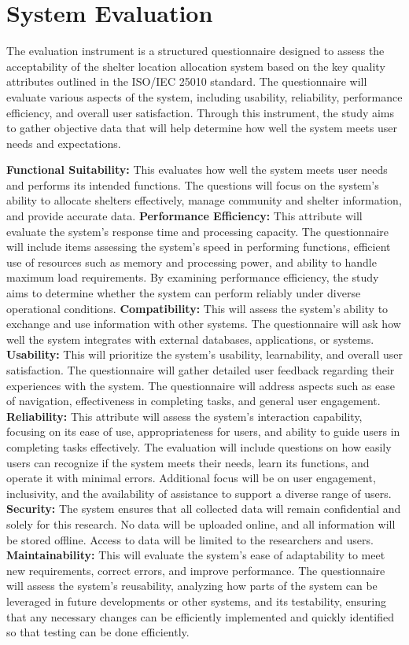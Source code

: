\section{System Evaluation}

The evaluation instrument is a structured questionnaire designed to assess the acceptability of the shelter location allocation system based on the key quality attributes outlined in the ISO/IEC 25010 standard. The questionnaire will evaluate various aspects of the system, including usability, reliability, performance efficiency, and overall user satisfaction. Through this instrument, the study aims to gather objective data that will help determine how well the system meets user needs and expectations.

\textbf{Functional Suitability:} This evaluates how well the system meets user needs and performs its intended functions. The questions will focus on the system's ability to allocate shelters effectively, manage community and shelter information, and provide accurate data.
\textbf{Performance Efficiency:} This attribute will evaluate the system's response time and processing capacity. The questionnaire will include items assessing the system's speed in performing functions, efficient use of resources such as memory and processing power, and ability to handle maximum load requirements. By examining performance efficiency, the study aims to determine whether the system can perform reliably under diverse operational conditions.
\textbf{Compatibility:} This will assess the system’s ability to exchange and use information with other systems. The questionnaire will ask how well the system integrates with external databases, applications, or systems. 
\textbf{Usability:} This will prioritize the system's usability, learnability, and overall user satisfaction. The questionnaire will gather detailed user feedback regarding their experiences with the system. The questionnaire will address aspects such as ease of navigation, effectiveness in completing tasks, and general user engagement.
\textbf{Reliability:} This attribute will assess the system's interaction capability, focusing on its ease of use, appropriateness for users, and ability to guide users in completing tasks effectively. The evaluation will include questions on how easily users can recognize if the system meets their needs, learn its functions, and operate it with minimal errors. Additional focus will be on user engagement, inclusivity, and the availability of assistance to support a diverse range of users. 
\textbf{Security:} The system ensures that all collected data will remain confidential and solely for this research. No data will be uploaded online, and all information will be stored offline. Access to data will be limited to the researchers and users.
\textbf{Maintainability:} This will evaluate the system's ease of adaptability to meet new requirements, correct errors, and improve performance. The questionnaire will assess the system's reusability, analyzing how parts of the system can be leveraged in future developments or other systems, and its testability, ensuring that any necessary changes can be efficiently implemented and quickly identified so that testing can be done efficiently. 
